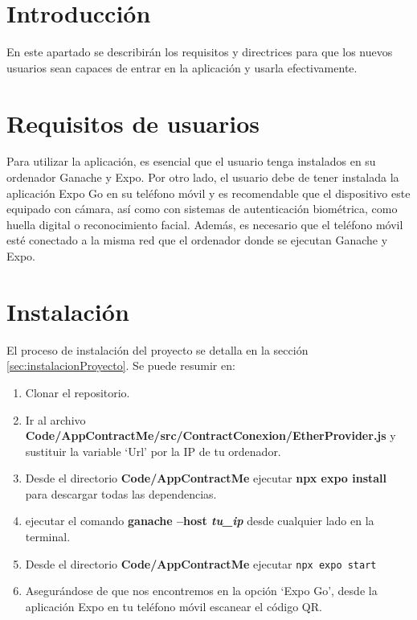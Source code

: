 
\section{Introducción}

En este apartado se describirán los requisitos y directrices para que los nuevos usuarios sean capaces de entrar en la aplicación y usarla efectivamente.

\section{Requisitos de usuarios}

Para utilizar la aplicación, es esencial que el usuario tenga instalados en su ordenador Ganache y Expo. 
Por otro lado, el usuario debe de tener instalada la aplicación Expo Go en su teléfono móvil y es recomendable que el dispositivo este equipado con cámara, así como con sistemas de autenticación biométrica, como huella digital o reconocimiento facial. 
Además, es necesario que el teléfono móvil esté conectado a la misma red que el ordenador donde se ejecutan Ganache y Expo.

\section{Instalación}

El proceso de instalación del proyecto se detalla en la sección \ref{sec:instalacionProyecto}. 
Se puede resumir en:

\begin{enumerate}

\item Clonar el repositorio.

\item Ir al archivo \textbf{Code/AppContractMe/src/ContractConexion/EtherProvider.js} y sustituir la variable `Url' por la IP de tu ordenador.

\item Desde el directorio \textbf{Code/AppContractMe} ejecutar \textbf{npx expo install} para descargar todas las dependencias.

\item ejecutar el comando \textbf{ganache --host \textit{tu\_ip} } desde cualquier lado en la terminal.

\item Desde el directorio \textbf{Code/AppContractMe} ejecutar \texttt{npx expo start}

\item Asegurándose de que nos encontremos en la opción `Expo Go', desde la aplicación Expo en tu teléfono móvil escanear el código QR.

\end{enumerate}

